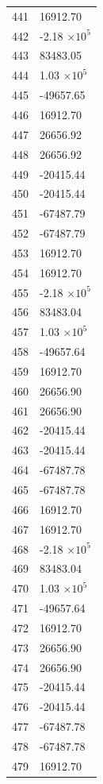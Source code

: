 \documentclass[a4paper,11pt]{article}
\begin{document}
\begin{center}
\begin{longtable}{|R{1.5cm}|R{2.5cm}|}
  441 &     16912.70 \\
  442 &        -2.18 $\times 10^{           5}$ \\
  443 &     83483.05 \\
  444 &         1.03 $\times 10^{           5}$ \\
  445 &    -49657.65 \\
  446 &     16912.70 \\
  447 &     26656.92 \\
  448 &     26656.92 \\
  449 &    -20415.44 \\
  450 &    -20415.44 \\
  451 &    -67487.79 \\
  452 &    -67487.79 \\
  453 &     16912.70 \\
  454 &     16912.70 \\
  455 &        -2.18 $\times 10^{           5}$ \\
  456 &     83483.04 \\
  457 &         1.03 $\times 10^{           5}$ \\
  458 &    -49657.64 \\
  459 &     16912.70 \\
  460 &     26656.90 \\
  461 &     26656.90 \\
  462 &    -20415.44 \\
  463 &    -20415.44 \\
  464 &    -67487.78 \\
  465 &    -67487.78 \\
  466 &     16912.70 \\
  467 &     16912.70 \\
  468 &        -2.18 $\times 10^{           5}$ \\
  469 &     83483.04 \\
  470 &         1.03 $\times 10^{           5}$ \\
  471 &    -49657.64 \\
  472 &     16912.70 \\
  473 &     26656.90 \\
  474 &     26656.90 \\
  475 &    -20415.44 \\
  476 &    -20415.44 \\
  477 &    -67487.78 \\
  478 &    -67487.78 \\
  479 &     16912.70 \\

\end{longtable}
\end{center}
\end{document}
